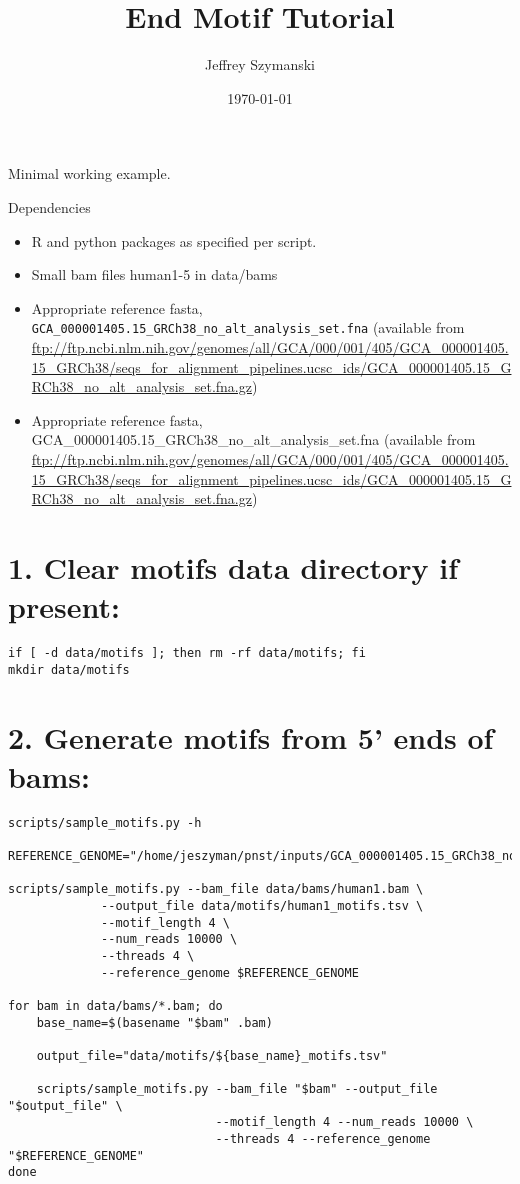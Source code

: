\documentclass{article}
\author{Jeffrey Szymanski}
\date{\today}
\title{End Motif Tutorial}
\begin{document}
\maketitle
Minimal working example.

Dependencies
\begin{itemize}
\item R and python packages as specified per script.
\item Small bam files human1-5 in data/bams
\item Appropriate reference fasta, \texttt{GCA\_000001405.15\_GRCh38\_no\_alt\_analysis\_set.fna} (available from \url{ftp://ftp.ncbi.nlm.nih.gov/genomes/all/GCA/000/001/405/GCA\_000001405.15\_GRCh38/seqs\_for\_alignment\_pipelines.ucsc\_ids/GCA\_000001405.15\_GRCh38\_no\_alt\_analysis\_set.fna.gz})

\item Appropriate reference fasta, GCA\_000001405.15\_GRCh38\_no\_alt\_analysis\_set.fna (available from \url{ftp://ftp.ncbi.nlm.nih.gov/genomes/all/GCA/000/001/405/GCA\_000001405.15\_GRCh38/seqs\_for\_alignment\_pipelines.ucsc\_ids/GCA\_000001405.15\_GRCh38\_no\_alt\_analysis\_set.fna.gz})
\end{itemize}


\section*{1. Clear motifs data directory if present:}
\label{sec:org473b507}

\begin{verbatim}
if [ -d data/motifs ]; then rm -rf data/motifs; fi
mkdir data/motifs
\end{verbatim}

\section*{2. Generate motifs from 5' ends of bams:}
\label{sec:org229c580}

\begin{verbatim}
scripts/sample_motifs.py -h

REFERENCE_GENOME="/home/jeszyman/pnst/inputs/GCA_000001405.15_GRCh38_no_alt_analysis_set.fna"

scripts/sample_motifs.py --bam_file data/bams/human1.bam \
			 --output_file data/motifs/human1_motifs.tsv \
			 --motif_length 4 \
			 --num_reads 10000 \
			 --threads 4 \
			 --reference_genome $REFERENCE_GENOME

for bam in data/bams/*.bam; do
    base_name=$(basename "$bam" .bam)

    output_file="data/motifs/${base_name}_motifs.tsv"

    scripts/sample_motifs.py --bam_file "$bam" --output_file "$output_file" \
                             --motif_length 4 --num_reads 10000 \
                             --threads 4 --reference_genome "$REFERENCE_GENOME"
done
\end{verbatim}
\end{document}
